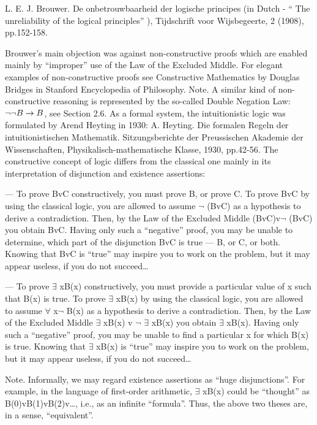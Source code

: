 L. E. J. Brouwer. De onbetrouwbaarheid der logische principes (in Dutch - `` The unreliability of the logical principles'' ), Tijdschrift voor Wijsbegeerte, 2 (1908), pp.152-158.

Brouwer's main objection was against non-constructive proofs which are enabled mainly by ``improper'' use of the Law of the Excluded Middle.  For elegant examples of non-constructive proofs see Constructive Mathematics by Douglas Bridges in Stanford Encyclopedia of Philosophy.  Note. A similar kind of non-constructive reasoning is represented by the so-called Double Negation Law: \(\neg \neg B\rightarrow B\), see Section 2.6.  As a formal system, the intuitionistic logic was formulated by Arend Heyting in 1930: A. Heyting. Die formalen Regeln der intuitionistischen Mathematik. Sitzungsberichte der Preussischen Akademie der Wissenschaften, Physikalisch-mathematische Klasse, 1930, pp.42-56.  The constructive concept of logic differs from the classical one mainly in its interpretation of disjunction and existence assertions:

--- To prove BvC constructively, you must prove B, or prove C. To prove BvC by using the classical logic, you are allowed to assume \(\neg\) (BvC) as a hypothesis to derive a contradiction. Then, by the Law of the Excluded Middle (BvC)v\(\neg\) (BvC) you obtain BvC. Having only such a ``negative'' proof, you may be unable to determine, which part of the disjunction BvC is true --- B, or C, or both. Knowing that BvC is ``true'' may inspire you to work on the problem, but it may appear useless, if you do not succeed\ldots

--- To prove \(\exists\) xB(x) constructively, you must provide a particular value of x such that B(x) is true. To prove \(\exists\) xB(x) by using the classical logic, you are allowed to assume \(\forall\) x\(\neg\) B(x) as a hypothesis to derive a contradiction. Then, by the Law of the Excluded Middle \(\exists\) xB(x) v \(\neg\) \(\exists\) xB(x) you obtain \(\exists\) xB(x). Having only such a ``negative'' proof, you may be unable to find a particular x for which B(x) is true. Knowing that \(\exists\) xB(x) is ``true'' may inspire you to work on the problem, but it may appear useless, if you do not succeed\ldots

\begin{note}[]
Note. Informally, we may regard existence assertions as ``huge disjunctions''. For example, in the language of first-order arithmetic, \(\exists\) xB(x) could be ``thought'' as B(0)vB(1)vB(2)v\ldots , i.e., as an infinite ``formula''. Thus, the above two theses are, in a sense, ``equivalent''.
\end{note}


